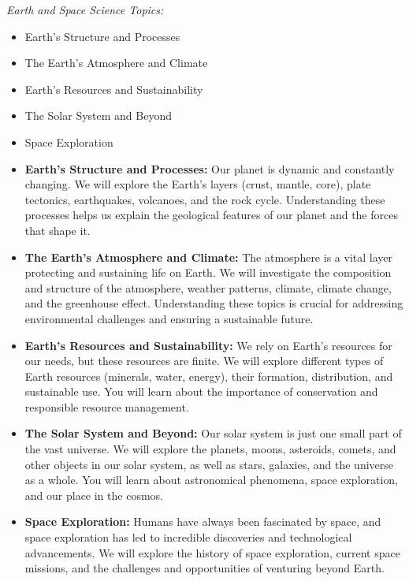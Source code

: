 \begin{marginnote}
\textit{Earth and Space Science Topics:}
\begin{itemize}
    \item Earth's Structure and Processes
    \item The Earth's Atmosphere and Climate
    \item Earth's Resources and Sustainability
    \item The Solar System and Beyond
    \item Space Exploration
\end{itemize}
\end{marginnote}

\begin{itemize}
    \item \textbf{Earth's Structure and Processes:}  Our planet is dynamic and constantly changing.  We will explore the Earth's layers (crust, mantle, core), plate tectonics, earthquakes, volcanoes, and the rock cycle.  Understanding these processes helps us explain the geological features of our planet and the forces that shape it.
    \item \textbf{The Earth's Atmosphere and Climate:}  The atmosphere is a vital layer protecting and sustaining life on Earth.  We will investigate the composition and structure of the atmosphere, weather patterns, climate, climate change, and the greenhouse effect.  Understanding these topics is crucial for addressing environmental challenges and ensuring a sustainable future.
    \item \textbf{Earth's Resources and Sustainability:}  We rely on Earth's resources for our needs, but these resources are finite.  We will explore different types of Earth resources (minerals, water, energy), their formation, distribution, and sustainable use.  You will learn about the importance of conservation and responsible resource management.
    \item \textbf{The Solar System and Beyond:}  Our solar system is just one small part of the vast universe.  We will explore the planets, moons, asteroids, comets, and other objects in our solar system, as well as stars, galaxies, and the universe as a whole.  You will learn about astronomical phenomena, space exploration, and our place in the cosmos.
    \item \textbf{Space Exploration:}  Humans have always been fascinated by space, and space exploration has led to incredible discoveries and technological advancements.  We will explore the history of space exploration, current space missions, and the challenges and opportunities of venturing beyond Earth.
\end{itemize}

